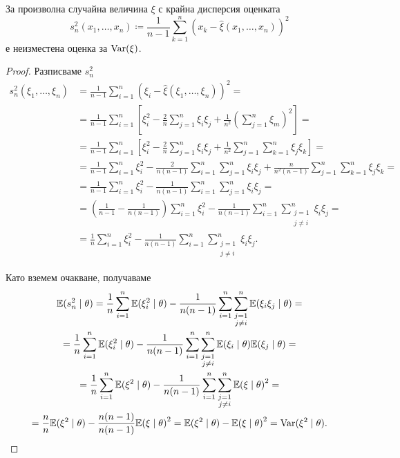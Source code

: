 \documentclass[numbers=endperiod, DIV=15, bibliography=totocnumbered]{scrartcl}
\begin{document}
\begin{proposition}\label{thm:unbiased-variation}
  За произволна случайна величина $\xi$ с крайна дисперсия оценката
  \begin{displaymath}
    s_n^2(x_1, \ldots, x_n) \coloneqq \frac 1 {n-1} \sum_{k=1}^n {(x_k - \hat \xi(x_1, \ldots, x_n))}^2
  \end{displaymath}
  е неизместена оценка за $\operatorname{Var}(\xi)$.
\end{proposition}
\begin{proof}
  Разписваме $s_n^2$
  \begingroup
  \allowdisplaybreaks
  \begin{align*}
    s_n^2(\xi_1, \ldots, \xi_n)
    &=
    \frac 1 {n-1} \sum_{i=1}^n {(\xi_i - \hat \xi(\xi_1, \ldots, \xi_n))}^2
    = \\ &=
    \frac 1 {n-1} \sum_{i=1}^n \left[\xi_i^2 - \frac 2 n \sum_{j=1}^n \xi_i \xi_j + \frac 1 {n^2} {\left( \sum_{j=1}^n \xi_m \right)}^2 \right]
    = \\ &=
    \frac 1 {n-1} \sum_{i=1}^n \left[\xi_i^2 - \frac 2 n \sum_{j=1}^n \xi_i \xi_j + \frac 1 {n^2} \sum_{j=1}^n \sum_{k=1}^n \xi_j \xi_k \right]
    = \\ &=
    \frac 1 {n-1} \sum_{i=1}^n \xi_i^2 - \frac 2 {n(n-1)} \sum_{i=1}^n \sum_{j=1}^n \xi_i \xi_j + \frac n {n^2 (n-1)} \sum_{j=1}^n \sum_{k=1}^n \xi_j \xi_k
    = \\ &=
    \frac 1 {n-1} \sum_{i=1}^n \xi_i^2 - \frac 1 {n(n-1)} \sum_{i=1}^n \sum_{j=1}^n \xi_i \xi_j
    = \\ &=
    \left(\frac 1 {n-1} - \frac 1 {n(n-1)} \right) \sum_{i=1}^n \xi_i^2 - \frac 1 {n(n-1)} \sum_{i=1}^n \sum_{\substack{j=1 \\ j\neq i}}^n \xi_i \xi_j
    = \\ &=
    \frac 1 n \sum_{i=1}^n \xi_i^2 - \frac 1 {n(n-1)} \sum_{i=1}^n \sum_{\substack{j=1 \\ j\neq i}}^n \xi_i \xi_j.
  \end{align*}
  \endgroup

  Като вземем очакване, получаваме
  \begin{multline*}
    \mathbb{E}(s_n^2 \mid \theta)
    =
    \frac 1 n \sum_{i=1}^n \mathbb{E}(\xi_i^2 \mid \theta) - \frac 1 {n(n-1)} \sum_{i=1}^n \sum_{\substack{j=1 \\ j\neq i}}^n \mathbb{E}(\xi_i \xi_j \mid \theta)
    = \\ =
    \frac 1 n \sum_{i=1}^n \mathbb{E}(\xi_i^2 \mid \theta) - \frac 1 {n(n-1)} \sum_{i=1}^n \sum_{\substack{j=1 \\ j\neq i}}^n \mathbb{E}(\xi_i \mid \theta) \mathbb{E}(\xi_j \mid \theta)
    = \\ =
    \frac 1 n \sum_{i=1}^n \mathbb{E}(\xi^2 \mid \theta) - \frac 1 {n(n-1)} \sum_{i=1}^n \sum_{\substack{j=1 \\ j\neq i}}^n {\mathbb{E}(\xi \mid \theta)}^2
    = \\ =
    \frac n n \mathbb{E}(\xi^2 \mid \theta) - \frac {n(n-1)} {n(n-1)} {\mathbb{E}(\xi \mid \theta)}^2
    =
    \mathbb{E}(\xi^2 \mid \theta) - {\mathbb{E}(\xi \mid \theta)}^2
    =
    \operatorname{Var}(\xi^2 \mid \theta).
  \end{multline*}
\end{proof}
\end{document}
